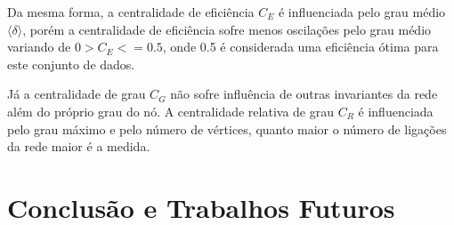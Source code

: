 \documentclass[12pt]{article}
\begin{document}
Da mesma forma, a centralidade de eficiência $C_E$ é influenciada pelo grau médio $\langle \delta \rangle$, porém a centralidade de eficiência sofre menos oscilações pelo grau médio variando de $0>C_E<=0.5$, onde 0.5 é considerada uma eficiência ótima para este conjunto de dados.

Já a centralidade de grau $C_G$ não sofre influência de outras invariantes da rede além do próprio grau do nó. 
A centralidade relativa de grau $C_R$ é influenciada pelo grau máximo e pelo número de vértices, quanto maior o número de ligações da rede maior é a medida.


\section{Conclusão e Trabalhos Futuros}\label{sec:conc}



\end{document}
